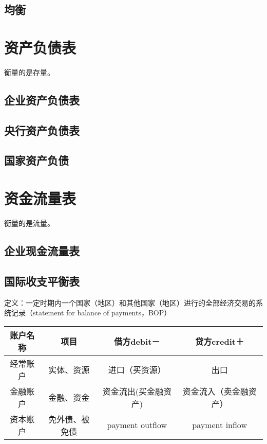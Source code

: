 \documentclass[12pt]{book}
\begin{document}
\section{均衡}





\chapter{资产负债表}

衡量的是存量。

\section{企业资产负债表}



\section{央行资产负债表}

\section{国家资产负债}












\chapter{资金流量表}

衡量的是流量。




\section{企业现金流量表}



\section{国际收支平衡表}


定义：一定时期内一个国家（地区）和其他国家（地区）进行的全部经济交易的系统记录（statement for balance of payments，BOP）


\begin{tabu}{|c|c|c|c|}
    \hline
    账户名称 & 项目           & 借方debit－          & 贷方credit＋           \\\hline
    经常账户 & 实体、资源     & 进口（买资源）       & 出口                   \\\hline
    金融账户 & 金融、资金     & 资金流出(买金融资产) & 资金流入（卖金融资产） \\\hline
    资本账户 & 免外债、被免债 & payment outflow      & payment inflow         \\\hline
\end{tabu}
\end{document}
